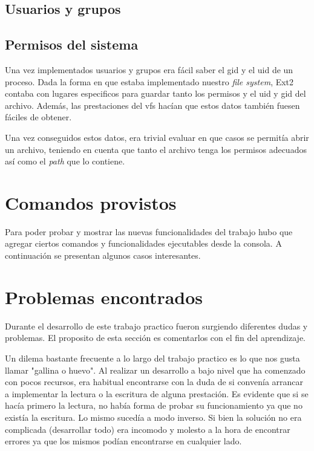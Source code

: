 \documentclass[a4paper,10pt]{article}
\begin{document}
    \subsection{Usuarios y grupos}

      
    
    \subsection{Permisos del sistema}

    Una vez implementados usuarios y grupos era fácil saber el gid y el uid de un proceso. Dada la forma en que estaba
    implementado nuestro \textit{file system}, Ext2 contaba con lugares especificos para guardar tanto los permisos y el
    uid y gid del archivo. Además, las prestaciones del vfs hacían que estos datos también fuesen fáciles de obtener.

    Una vez conseguidos estos datos, era trivial evaluar en que casos se permitía abrir un archivo, teniendo en cuenta
    que tanto el archivo tenga los permisos adecuados así como el \textit{path} que lo contiene.

\newpage
\section{Comandos provistos}
    Para poder probar y mostrar las nuevas funcionalidades del trabajo hubo que agregar ciertos comandos y
    funcionalidades ejecutables desde la consola. A continuación se presentan algunos casos interesantes.

\newpage
\section{Problemas encontrados}

Durante el desarrollo de este trabajo practico fueron surgiendo diferentes dudas y problemas. El proposito de esta
sección es comentarlos con el fin del aprendizaje.

Un dilema bastante frecuente a lo largo del trabajo practico es lo que nos gusta llamar "gallina o huevo". Al realizar
un desarrollo a bajo nivel que ha comenzado con pocos recursos, era habitual encontrarse con la duda de si convenía
arrancar a implementar la lectura o la escritura de alguna prestación. Es evidente que si se hacía primero la lectura, 
no había forma de probar su funcionamiento ya que no existía la escritura. Lo mismo sucedía a modo inverso. Si bien 
la solución no era complicada (desarrollar todo) era incomodo y molesto a la hora de encontrar errores ya que los mismos
podían encontrarse en cualquier lado.
\end{document}

